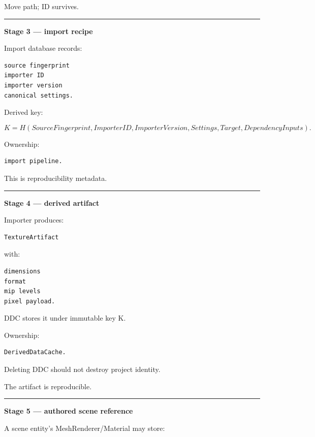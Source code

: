 Move path; ID survives.

\begin{center}\rule{0.5\linewidth}{0.5pt}\end{center}

\textbf{Stage 3 --- import recipe}

Import database records:

\begin{verbatim}
source fingerprint
importer ID
importer version
canonical settings.
\end{verbatim}

Derived key:

\[
K=
H(
SourceFingerprint,
ImporterID,
ImporterVersion,
Settings,
Target,
DependencyInputs
).
\]

Ownership:

\begin{verbatim}
import pipeline.
\end{verbatim}

This is reproducibility metadata.

\begin{center}\rule{0.5\linewidth}{0.5pt}\end{center}

\textbf{Stage 4 --- derived artifact}

Importer produces:

\begin{verbatim}
TextureArtifact
\end{verbatim}

with:

\begin{verbatim}
dimensions
format
mip levels
pixel payload.
\end{verbatim}

DDC stores it under immutable key K.

Ownership:

\begin{verbatim}
DerivedDataCache.
\end{verbatim}

Deleting DDC should not destroy project identity.

The artifact is reproducible.

\begin{center}\rule{0.5\linewidth}{0.5pt}\end{center}

\textbf{Stage 5 --- authored scene reference}

A scene entity's MeshRenderer/Material may store:

